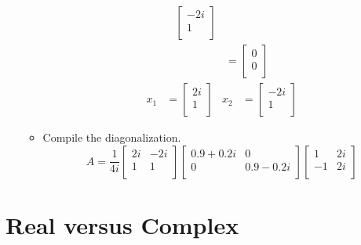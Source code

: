 \documentclass{article}
\begin{document}
\begin{itemize}
\begin{itemize}
\begin{align*}
\begin{bmatrix}
                -2i\\
                1\\
            \end{bmatrix}\\
            &=
            \begin{bmatrix}
                0\\
                0\\
            \end{bmatrix}
        \end{align*}
        \begin{align*}
            x_1 &=
            \begin{bmatrix}
                2i\\
                1\\
            \end{bmatrix}&
                x_2 &=
                \begin{bmatrix}
                    -2i\\
                    1\\
                \end{bmatrix}
        \end{align*}
        \item Compile the diagonalization.
        \begin{equation*}
            A = \frac{1}{4i}
            \begin{bmatrix}
                2i & -2i\\
                1 & 1\\
            \end{bmatrix}
            \begin{bmatrix}
                0.9+0.2i & 0\\
                0 & 0.9-0.2i\\
            \end{bmatrix}
            \begin{bmatrix}
                1 & 2i\\
                -1 & 2i\\
            \end{bmatrix}
        \end{equation*}
    \end{itemize}
\end{itemize}



\section*{Real versus Complex}
\end{document}
